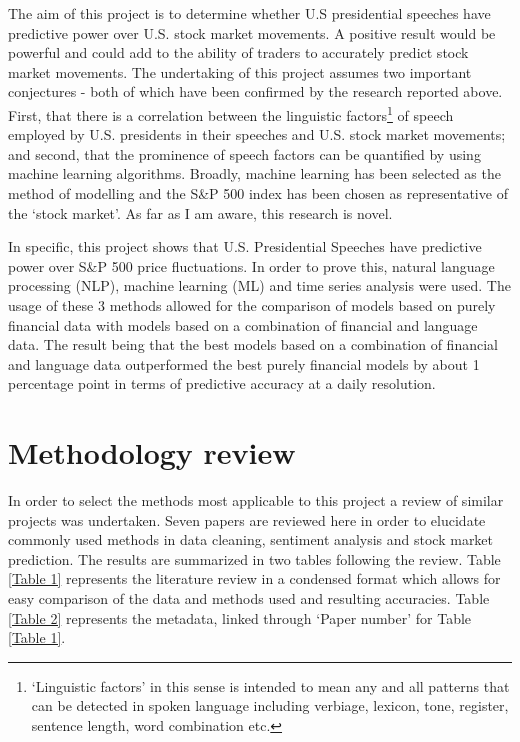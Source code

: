 \documentclass[11pt,preprint, authoryear]{elsarticle}
\numberwithin{equation}{section}
\numberwithin{figure}{section}
\numberwithin{table}{section}
\let\rmarkdownfootnote\footnote%
\def\footnote{\protect\rmarkdownfootnote}
\begin{document}
The aim of this project is to determine whether U.S presidential
speeches have predictive power over U.S. stock market movements. A
positive result would be powerful and could add to the ability of
traders to accurately predict stock market movements. The undertaking of
this project assumes two important conjectures - both of which have been
confirmed by the research reported above. First, that there is a
correlation between the linguistic factors\footnote{`Linguistic factors'
  in this sense is intended to mean any and all patterns that can be
  detected in spoken language including verbiage, lexicon, tone,
  register, sentence length, word combination etc.} of speech employed
by U.S. presidents in their speeches and U.S. stock market movements;
and second, that the prominence of speech factors can be quantified by
using machine learning algorithms. Broadly, machine learning has been
selected as the method of modelling and the S\&P 500 index has been
chosen as representative of the `stock market'. As far as I am aware,
this research is novel.

In specific, this project shows that U.S. Presidential Speeches have
predictive power over S\&P 500 price fluctuations. In order to prove
this, natural language processing (NLP), machine learning (ML) and time
series analysis were used. The usage of these 3 methods allowed for the
comparison of models based on purely financial data with models based on
a combination of financial and language data. The result being that the
best models based on a combination of financial and language data
outperformed the best purely financial models by about 1 percentage
point in terms of predictive accuracy at a daily resolution.

\hypertarget{methodology-review}{%
\section{Methodology review}\label{methodology-review}}

In order to select the methods most applicable to this project a review
of similar projects was undertaken. Seven papers are reviewed here in
order to elucidate commonly used methods in data cleaning, sentiment
analysis and stock market prediction. The results are summarized in two
tables following the review. Table \ref{Table 1} represents the
literature review in a condensed format which allows for easy comparison
of the data and methods used and resulting accuracies. Table
\ref{Table 2} represents the metadata, linked through `Paper number' for
Table \ref{Table 1}.
\end{document}
